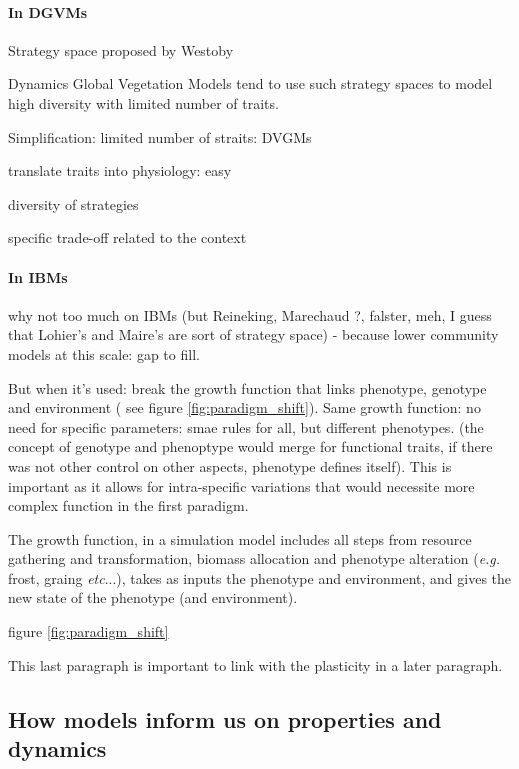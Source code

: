\paragraph{In DGVMs}

Strategy space proposed by Westoby 

Dynamics Global Vegetation Models tend to use such strategy spaces to model high diversity with limited number of traits. 

Simplification: limited number of straits: DVGMs

translate traits into physiology: easy

diversity of strategies

specific trade-off related to the context \parencite{scheiter_impacts_2009}

\paragraph{In IBMs}

why not too much on IBMs (but Reineking, Marechaud ?, falster, meh, I guess that Lohier's and Maire's are sort of strategy space) - because lower community models at this scale: gap to fill.

But when it's used: break the growth function that links phenotype, genotype and environment ( see figure \ref{fig:paradigm_shift}). Same growth function: no need for specific parameters: smae rules for all, but different phenotypes. (the concept of genotype and phenoptype would merge for functional traits, if there was not other control on other aspects, phenotype defines itself). This is important as it allows for intra-specific variations that would necessite more complex function in the first paradigm. 

The growth function, in a simulation model includes all steps from resource gathering and transformation, biomass allocation and phenotype alteration (\textit{e.g.} frost, graing \textit{etc}...), takes as inputs the phenotype and environment, and gives the new state of the phenotype (and environment). 

 figure \ref{fig:paradigm_shift}

This last paragraph is important to link with the plasticity in a later paragraph.


\subsection{How models inform us on properties and dynamics}

